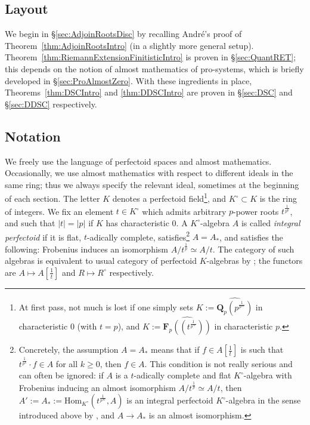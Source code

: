 \documentclass[10pt,reqno]{amsart}
\begin{document}
\subsection{Layout} We begin in \S \ref{sec:AdjoinRootsDisc} by recalling Andr\'e's proof of Theorem~\ref{thm:AdjoinRootsIntro} (in a slightly more general setup). Theorem~\ref{thm:RiemannExtensionFinitisticIntro} is proven in \S \ref{sec:QuantRET}; this depends on the notion of almost mathematics of pro-systems, which is briefly developed in \S \ref{sec:ProAlmostZero}. With these ingredients in place, Theorems~\ref{thm:DSCIntro} and \ref{thm:DDSCIntro} are proven in \S \ref{sec:DSC} and \S \ref{sec:DDSC} respectively.

\subsection{Notation}
\label{notation}
 We freely use the language of perfectoid spaces and almost mathematics. Occasionally, we use almost mathematics with respect to different ideals in the same ring; thus we always specify the relevant ideal, sometimes at the beginning of each section. The letter $K$ denotes a perfectoid field\footnote{At first pass, not much is lost if one simply sets $K := \widehat{\mathbf{Q}_p(p^{\frac{1}{p^\infty}})}$ in characteristic $0$ (with $t=p$), and $K := \widehat{\mathbf{F}_p ((t^{\frac{1}{p^\infty}}))}$ in characteristic $p$.}, and $K^\circ \subset K$ is the ring of integers. We fix an element $t \in K^\circ$ which admits arbitrary $p$-power roots $t^{\frac{1}{p^k}}$, and such that $|t| = |p|$ if $K$ has characteristic $0$. A $K^\circ$-algebra $A$ is called {\em integral perfectoid} if it is flat, $t$-adically complete, satisfies\footnote{Concretely, the assumption $A = A_*$ means that if $f \in A[\frac{1}{t}]$ is such that $t^{\frac{1}{p^k}} \cdot f \in A$ for all $k \geq 0$, then $f \in A$. This condition is not really serious and can often be ignored: if $A$ is a $t$-adically complete and flat $K^\circ$-algebra with Frobenius inducing an almost isomorphism $A/t^{\frac{1}{p}} \simeq A/t$, then $A' := A_* :=  \mathrm{Hom}_{K^\circ}(t^{\frac{1}{p^\infty}}, A)$ is an integral perfectoid $K^\circ$-algebra in the sense introduced above by \cite[Lemma 5.6]{ScholzePerfectoidSpaces}, and $A \to A_*$ is an almost isomorphism.} $A = A_*$, and satisfies the following: Frobenius induces an isomorphism $A/t^{\frac{1}{p}} \simeq A/t$. The category of such algebras is equivalent to usual category of perfectoid $K$-algebras by \cite[Theorem 5.2]{ScholzePerfectoidSpaces}; the functors are $A \mapsto A[\frac{1}{t}]$ and $R \mapsto R^\circ$ respectively. %
\end{document}
